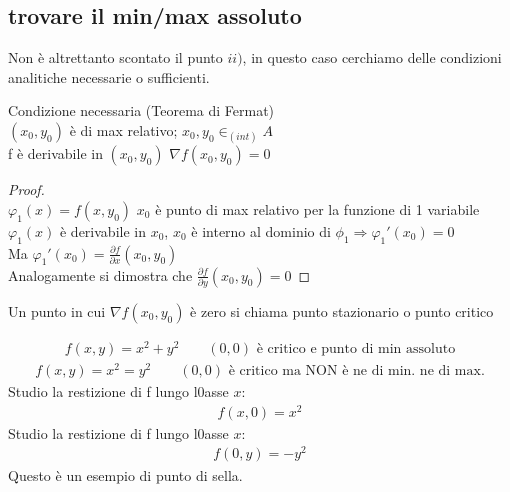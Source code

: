 \documentclass[a4paper, oneside]{article}
\begin{document}
        \subsection{trovare il min/max assoluto}
        Non è altrettanto scontato il punto $ii)$, in questo caso cerchiamo delle condizioni analitiche necessarie o sufficienti.\\
        \begin{proposition}
            Condizione necessaria (Teorema di Fermat)\\
             $(x_0,y_0)$ è di max relativo; $x_0,y_0 \in _{(int)}A$ \\
            f è derivabile in $(x_0,y_0)$  $\nabla f(x_0,y_0) = 0$
        \end{proposition}
        \begin{proof}
            \hfil\\
            $\varphi_1(x) = f(x,y_0)$
            $x_0$ è punto di max relativo per la funzione di 1 variabile $\varphi_1(x)$ è derivabile in $x_0$, $x_0$ è interno al dominio di $\phi_1 \Rightarrow \varphi_1'(x_0) = 0$\\
            Ma $\varphi_1'(x_0) = \frac{\partial f}{\partial x}(x_0,y_0)$\\
            Analogamente si dimostra che $\frac{\partial f}{\partial y} (x_0,y_0) = 0$
        \end{proof}
        \begin{proposition}
            Un punto in cui $\nabla f(x_0,y_0)$ è zero si chiama punto stazionario o punto critico
        \end{proposition}
        \begin{example}
            \begin{gather*}
                f(x,y) = x^2+y^2 \qquad (0,0) \text{ è critico e punto di min assoluto}
            \end{gather*}
            \begin{gather*}
                f(x,y) = x^2 = y^2 \qquad (0,0) \text{ è critico ma NON è ne di min. ne di max.}
            \end{gather*}
            Studio la restizione di f lungo l0asse $x$:\\
            \begin{gather*}
                f(x,0) = x^2
            \end{gather*}
            Studio la restizione di f lungo l0asse $x$:\\
            \begin{gather*}
                f(0,y) = -y^2
            \end{gather*}
            Questo è un esempio di punto di sella.
        \end{example}
\end{document}
